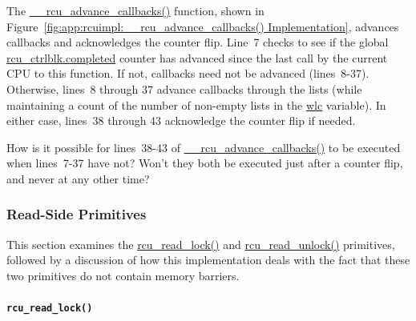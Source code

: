 The \url{__rcu_advance_callbacks()} function, shown in
Figure~\ref{fig:app:rcuimpl:__rcu_advance_callbacks() Implementation},
advances callbacks and acknowledges the counter flip.
Line~7 checks to see if the global \url{rcu_ctrlblk.completed}
counter has advanced since the last call by the current CPU to this
function.
If not, callbacks need not be advanced (lines~8-37).
Otherwise, lines~8 through 37 advance callbacks through the lists
(while maintaining a count of the number of non-empty lists in the
\url{wlc} variable).
In either case, lines~38 through 43 acknowledge the counter flip
if needed.

\QuickQuiz{}
	How is it possible for lines~38-43 of
	\url{__rcu_advance_callbacks()} to be executed when
	lines~7-37 have not?
	Won't they both be executed just after a counter flip, and
	never at any other time?
 \QuickQuizEnd


\subsubsection{Read-Side Primitives}
\label{app:rcuimpl:Read-Side Primitives}

This section examines the \url{rcu_read_lock()} and
\url{rcu_read_unlock()} primitives, followed by a
discussion of how this implementation deals with the fact
that these two primitives do not contain memory barriers.

\paragraph{{\tt rcu\_read\_lock()}}
\label{app:rcuimpl:rcu_read_lock()}

